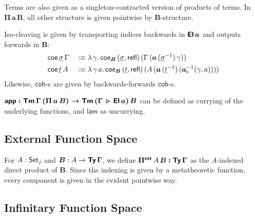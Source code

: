 \documentclass[sigplan,review,anonymous]{acmart}\settopmatter{printfolios=true,printccs=false,printacmref=false}
\newcommand{\ext}{\triangleright}
\newcommand{\Pii}{\Pi}
\newcommand{\appi}{\mathsf{app}}
\newcommand{\lami}{\mathsf{lam}}
\newcommand{\Pie}{\Pi^{\mathsf{ext}}}
\newcommand{\bTy}{\boldsymbol{\Ty}}
\newcommand{\bGamma}{\boldsymbol{\Gamma}}
\newcommand{\ba}{\boldsymbol{a}}
\newcommand{\bB}{\boldsymbol{B}}
\newcommand{\bEl}{\boldsymbol{\El}}
\newcommand{\bPii}{\boldsymbol{\Pi}}
\newcommand{\bPie}{\boldsymbol{\Pie}}
\newcommand{\ul}[1]{\underline{#1}}
\newcommand{\ulsigma}{\ul{\sigma}}
\newcommand{\ult}{\ul{t}}
\newcommand{\coe}{\mathsf{coe}}
\newcommand{\coh}{\mathsf{coh}}
\begin{document}
Terms are also given as a singleton-contracted version of products of terms. In
$\bPii\,\ba\,\bB$, all other structure is given pointwise by $\bB$-structure.

Iso-cleaving is given by transporting indices backwards in $\bEl\,\ba$ and outputs forwards
in $\bB$:
\begin{alignat*}{3}
  & \coe\,\ulsigma\,\Gamma &&:\equiv
    \lambda\,\gamma.\,\coe_{\bB}\,(\ulsigma,\refl)\,(\Gamma\,(\ba\,(\ulsigma^{-1})\,\gamma))\\
  & \coe\,\ult\,A &&:\equiv
    \lambda\,\gamma\,a.\,\coe_{\bB}\,(\ult,\refl)\,(A\,(\ba\,(\ult^{-1})\,(\ba_{\ext}^{-1}(\gamma,a))))
\end{alignat*}
Likewise, $\coh$-s are given by backwards-forwards $\coh$-s.

$\boldsymbol{\appi : \Tm\,\Gamma\,(\Pii\,a\,B)\ra
  \Tm\,(\Gamma\,\ext\,\El\,a)\,B}$ can be defined as currying of the underlying
functions, and $\boldsymbol{\lami}$ as uncurrying.


\subsection{External Function Space}

For $A : \mathsf{Set}_j$ and $\bB : A \ra \bTy\,\bGamma$, we define $\bPie\,A\,\bB
\boldsymbol{:} \bTy\,\bGamma$ as the $A$-indexed direct product of $\bB$. Since
the indexing is given by a metatheoretic function, every component is given in the
evident pointwise way.

\subsection{Infinitary Function Space}
\label{sec:infinitaryfunction}
\end{document}
